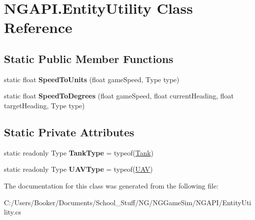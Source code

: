 \hypertarget{class_n_g_a_p_i_1_1_entity_utility}{}\section{N\+G\+A\+P\+I.\+Entity\+Utility Class Reference}
\label{class_n_g_a_p_i_1_1_entity_utility}
\subsection*{Static Public Member Functions}
\begin{DoxyCompactItemize}
\item 
\mbox{\label{class_n_g_a_p_i_1_1_entity_utility_aef35541447f3f996506cf8f9d8122e83}} 
static float {\bfseries Speed\+To\+Units} (float game\+Speed, Type type)
\item 
\mbox{\label{class_n_g_a_p_i_1_1_entity_utility_ac3961cb51b56874ede494d977b8f88ff}} 
static float {\bfseries Speed\+To\+Degrees} (float game\+Speed, float current\+Heading, float target\+Heading, Type type)
\end{DoxyCompactItemize}
\subsection*{Static Private Attributes}
\begin{DoxyCompactItemize}
\item 
\mbox{\label{class_n_g_a_p_i_1_1_entity_utility_a585dd1a94420b59207cc959ac88c07db}} 
static readonly Type {\bfseries Tank\+Type} = typeof(\hyperlink{class_n_g_a_p_i_1_1_tank}{Tank})
\item 
\mbox{\label{class_n_g_a_p_i_1_1_entity_utility_a3f9cf02fb604fcc748535ce06a29f8a6}} 
static readonly Type {\bfseries U\+A\+V\+Type} = typeof(\hyperlink{class_n_g_a_p_i_1_1_u_a_v}{U\+AV})
\end{DoxyCompactItemize}


The documentation for this class was generated from the following file\+:\begin{DoxyCompactItemize}
\item 
C\+:/\+Users/\+Booker/\+Documents/\+School\+\_\+\+Stuff/\+N\+G/\+N\+G\+Game\+Sim/\+N\+G\+A\+P\+I/Entity\+Utility.\+cs\end{DoxyCompactItemize}
